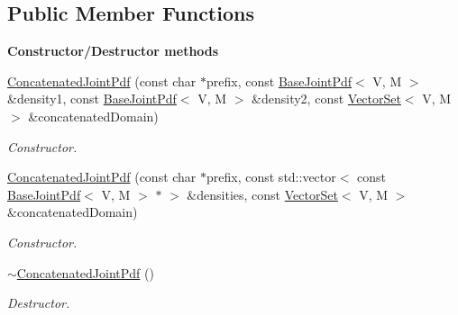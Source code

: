 \subsection*{Public Member Functions}
\begin{Indent}{\bf Constructor/\-Destructor methods}\par
\begin{DoxyCompactItemize}
\item 
\hyperlink{class_q_u_e_s_o_1_1_concatenated_joint_pdf_aff646f6aafe63e66dca291925bad6ca1}{Concatenated\-Joint\-Pdf} (const char $\ast$prefix, const \hyperlink{class_q_u_e_s_o_1_1_base_joint_pdf}{Base\-Joint\-Pdf}$<$ V, M $>$ \&density1, const \hyperlink{class_q_u_e_s_o_1_1_base_joint_pdf}{Base\-Joint\-Pdf}$<$ V, M $>$ \&density2, const \hyperlink{class_q_u_e_s_o_1_1_vector_set}{Vector\-Set}$<$ V, M $>$ \&concatenated\-Domain)
\begin{DoxyCompactList}\small\item\em Constructor. \end{DoxyCompactList}\item 
\hyperlink{class_q_u_e_s_o_1_1_concatenated_joint_pdf_a96f8908c3ee9d975919624b37eea20bb}{Concatenated\-Joint\-Pdf} (const char $\ast$prefix, const std\-::vector$<$ const \hyperlink{class_q_u_e_s_o_1_1_base_joint_pdf}{Base\-Joint\-Pdf}$<$ V, M $>$ $\ast$ $>$ \&densities, const \hyperlink{class_q_u_e_s_o_1_1_vector_set}{Vector\-Set}$<$ V, M $>$ \&concatenated\-Domain)
\begin{DoxyCompactList}\small\item\em Constructor. \end{DoxyCompactList}\item 
\hyperlink{class_q_u_e_s_o_1_1_concatenated_joint_pdf_a9b4a0c33fa7dc23034be19455de61bcd}{$\sim$\-Concatenated\-Joint\-Pdf} ()
\begin{DoxyCompactList}\small\item\em Destructor. \end{DoxyCompactList}\end{DoxyCompactItemize}
\end{Indent}
